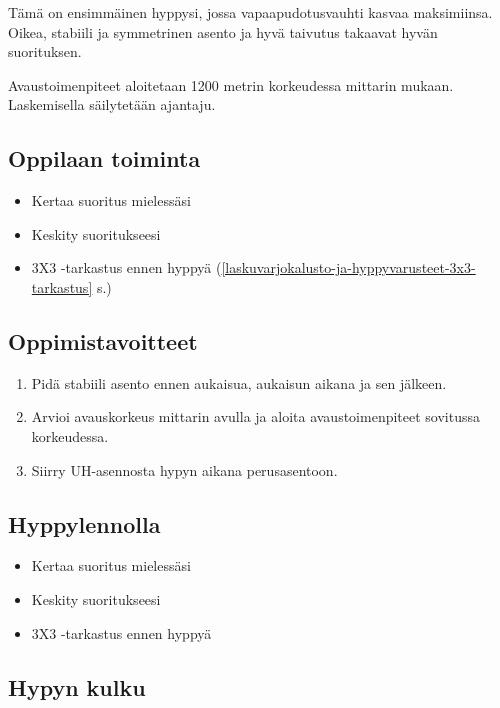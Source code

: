 \begin{multicols}{2}
Tämä on ensimmäinen hyppysi, jossa vapaapudotusvauhti kasvaa maksimiinsa. Oikea, stabiili ja symmetrinen asento ja hyvä taivutus takaavat hyvän suorituksen. 


Avaustoimenpiteet aloitetaan 1200 metrin korkeudessa mittarin mukaan. Laskemisella säilytetään ajantaju. 

\subsection{ Oppilaan toiminta }
\label{pl-alkeiskoulutuksen-suoritukset-oppilaan-toiminta}

\begin{itemize}
\item Kertaa suoritus mielessäsi 
\item Keskity suoritukseesi 
\item 3X3 -tarkastus ennen hyppyä (\ref{laskuvarjokalusto-ja-hyppyvarusteet-3x3-tarkastus} s.\pageref{laskuvarjokalusto-ja-hyppyvarusteet-3x3-tarkastus}) 
\end{itemize}
\subsection{ Oppimistavoitteet }
\label{pl-alkeiskoulutuksen-suoritukset-oppimistavoitteet}

\begin{enumerate}[label=\bfseries \arabic*)]
\item  Pidä stabiili asento ennen aukaisua, aukaisun aikana ja sen jälkeen.  
\item  Arvioi avauskorkeus mittarin avulla ja aloita avaustoimenpiteet sovitussa korkeudessa. 
\item  Siirry UH-asennosta hypyn aikana perusasentoon. 
\end{enumerate}
\subsection{ Hyppylennolla }
\label{pl-alkeiskoulutuksen-suoritukset-hyppylennolla}

\begin{itemize}
\item Kertaa suoritus mielessäsi 
\item Keskity suoritukseesi 
\item 3X3 -tarkastus ennen hyppyä 
\end{itemize}
\subsection{ Hypyn kulku }
\label{pl-alkeiskoulutuksen-suoritukset-hypyn-kulku}


\end{multicols}
